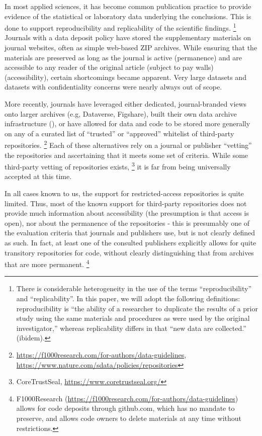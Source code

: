 In most applied sciences,
it has become common publication practice to provide evidence of the
statistical or laboratory data underlying the conclusions. This is done
to support reproducibility and replicability of the scientific
findings.%
\footnote{There is considerable heterogeneity in the use of the terms
	``reproducibility'' and ``replicability''. In this paper, we will adopt
	the following definitions: reproducibility is ``the ability of a
	researcher to duplicate the results of a prior study using the same
	materials and procedures as were used by the original investigator,''
	\parencite{BollenSocialBehavioralEconomic2015} whereas replicability
	differs in that ``new data are collected.'' (ibidem).} 
Journals with a
data deposit policy have stored the supplementary materials on journal
websites, often as simple web-based ZIP archives. While ensuring that
the materials are preserved as long as the journal is active
(permanence) and are accessible to any reader of the original article
(subject to pay walls) (accessibility), certain shortcomings became
apparent. Very large datasets and datasets with confidentiality concerns
were nearly always out of scope. 

More recently, journals have leveraged
either dedicated, journal-branded views onto larger archives (e.g,
Dataverse, Figshare), built their own data archive infrastructure
(), or have allowed for data and code to be stored
more generally on any of a curated list of ``trusted'' or ``approved''
whitelist of third-party repositories.%
\footnote{\url{https://f1000research.com/for-authors/data-guidelines}, \url{https://www.nature.com/sdata/policies/repositories}}
Each of these alternatives rely
on a journal or publisher ``vetting'' the repositories and ascertaining
that it meets some set of criteria.  While some third-party vetting of
repositories exists,%
\footnote{CoreTrustSeal, \url{https://www.coretrustseal.org/}}
it is far from being universally accepted at this
time. 

In all cases known to us, the support for restricted-access
repositories is quite limited. Thus, most of the known support for
third-party repositories does not provide much information about
accessibility (the presumption is that access is open), nor about the
permanence of the repositories - this is presumably one of the
evaluation criteria that journals and publishers use, but is not clearly
defined as such. In fact, at least one of the consulted publishers
explicitly allows for quite transitory repositories for code, without
clearly distinguishing that from archives that are more permanent.%
\footnote{F1000Research (\url{https://f1000research.com/for-authors/data-guidelines}) allows for code deposits through github.com, which has no mandate to preserve, and allows code owners to delete materials at any time without restrictions.}


